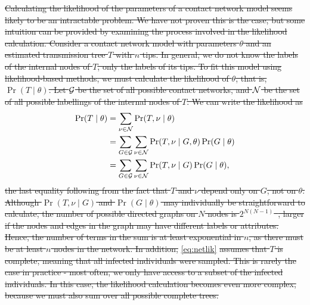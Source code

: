 {\color{red}\sout{Calculating the likelihood of the parameters of a contact
network model seems likely to be an intractable problem. We have not proven
this is the case, but some intuition can be provided by examining the process
involved in the likelihood calculation. Consider a contact network model with
parameters $\theta$ and an estimated transmission tree $T$ with $n$ tips. In
general, we do not know the labels of the internal nodes of $T$, only the
labels of its tips. To fit this model using likelihood-based methods, we must
calculate the likelihood of $\theta$, that is, $\Pr(T \mid \theta)$. Let $\mathcal{G}$
be the set of all possible contact networks, and $\mathcal{N}$ be the set of all
possible labellings of the internal nodes of $T$. We can write the likelihood
as}
\begin{align}
\begin{split}
  \label{eq:netlik}
  \Pr(T \mid \theta)
    &= \sum_{\nu \in \mathcal{N}} \Pr(T, \nu \mid \theta) \\
    &= \sum_{G \in \mathcal{G}} \sum_{\nu \in \mathcal{N}} \Pr(T, \nu \mid G, \theta) \Pr(G \mid \theta) \\
    &= \sum_{G \in \mathcal{G}} \sum_{\nu \in \mathcal{N}} \Pr(T, \nu \mid G) \Pr(G \mid \theta),
\end{split}
\end{align}
\sout{the last equality following from the fact that $T$ and $\nu$ depend only
on $G$, not on $\theta$. Although $\Pr(T, \nu \mid G)$ and $\Pr(G \mid \theta)$
may individually be straightforward to calculate, the number of possible
directed graphs on $N$ nodes is $2^{N(N-1)}$~\autocite{harary2014graphical},
larger if the nodes and edges in the graph may have different labels or
attributes. Hence, the number of terms in the sum is at least exponential in
$n$, as there must be at least $n$ nodes in the network. In addition,
}\cref{eq:netlik} \sout{assumes that $T$ is complete, meaning that all infected
individuals were sampled. This is rarely the case in practice - most often, we
only have access to a subset of the infected individuals. In this case, the
likelihood calculation becomes even more complex, because we must also sum over
all possible complete trees.}}

